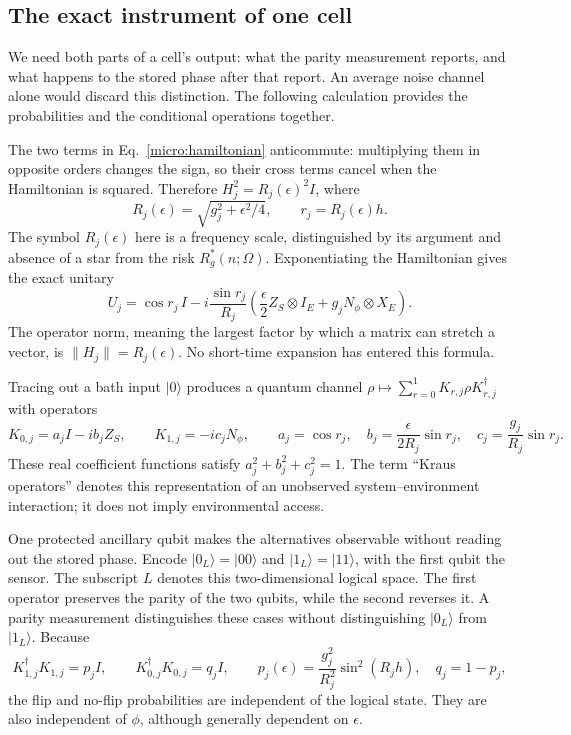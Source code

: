 \documentclass[11pt,a4paper]{article}
\numberwithin{equation}{section}
\theoremstyle{remark}
\begin{document}
\subsection{The exact instrument of one cell}

We need both parts of a cell's output: what the parity measurement reports,
and what happens to the stored phase after that report. An average noise
channel alone would discard this distinction. The following calculation
provides the probabilities and the conditional operations together.

The two terms in Eq.~\eqref{micro:hamiltonian} anticommute: multiplying them
in opposite orders changes the sign, so their cross terms cancel when the
Hamiltonian is squared. Therefore
$H_j^2=R_j(\epsilon)^2I$, where
\begin{equation}
 R_j(\epsilon)=\sqrt{g_j^2+\epsilon^2/4},\qquad r_j=R_j(\epsilon)h.
\end{equation}
The symbol $R_j(\epsilon)$ here is a frequency scale, distinguished by
its argument and absence of a star from the risk $R_g^*(n;\Omega)$.
Exponentiating the Hamiltonian gives the exact unitary
\begin{equation}
 U_j=\cos r_j\,I
     -i\frac{\sin r_j}{R_j}
       \left(\frac{\epsilon}{2}Z_S\otimes I_E
                        +g_jN_\phi\otimes X_E\right).
 \label{micro:unitary}
\end{equation}
The operator norm, meaning the largest factor by which a matrix can stretch
a vector, is
$\|H_j\|=R_j(\epsilon)$. No short-time expansion has entered this formula.

Tracing out a bath input $|0\rangle$ produces a quantum channel
$\rho\mapsto\sum_{r=0}^1K_{r,j}\rho K_{r,j}^\dagger$ with operators
\begin{equation}
 K_{0,j}=a_jI-ib_jZ_S,\qquad K_{1,j}=-ic_jN_\phi,
 \qquad
 a_j=\cos r_j,\quad
 b_j=\frac{\epsilon}{2R_j}\sin r_j,\quad
 c_j=\frac{g_j}{R_j}\sin r_j.
 \label{micro:kraus}
\end{equation}
These real coefficient functions satisfy $a_j^2+b_j^2+c_j^2=1$. The term
``Kraus operators'' denotes this representation of an unobserved
system--environment interaction; it does not imply environmental access.

One protected ancillary qubit makes the alternatives observable without
reading out the stored phase. Encode
$|0_L\rangle=|00\rangle$ and $|1_L\rangle=|11\rangle$, with the first
qubit the sensor. The subscript $L$ denotes this two-dimensional logical
space. The first operator preserves the parity of the two qubits, while
the second reverses it. A parity measurement distinguishes these cases
without distinguishing $|0_L\rangle$ from $|1_L\rangle$. Because
\begin{equation}
 K_{1,j}^\dagger K_{1,j}=p_jI,\qquad K_{0,j}^\dagger K_{0,j}=q_jI,
 \qquad
 p_j(\epsilon)=\frac{g_j^2}{R_j^2}\sin^2(R_jh),\quad q_j=1-p_j,
 \label{micro:probabilities}
\end{equation}
the flip and no-flip probabilities are independent of the logical state.
They are also independent of $\phi$, although generally dependent on
$\epsilon$.
\end{document}
